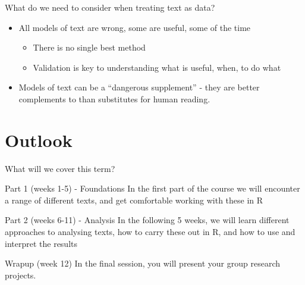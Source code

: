 \documentclass[
  10pt,
  ignorenonframetext,
  aspectratio=169]{beamer}
\begin{document}
\begin{frame}{What do we need to consider when treating text as data?}
\protect\hypertarget{what-do-we-need-to-consider-when-treating-text-as-data}{}
\label{CONSIDERATIONS}

\begin{itemize}
  \item<1-> All models of text are wrong, some are useful, some of the time 
  \begin{itemize}
    \item<2-> There is no single best method
    \item<3-> Validation is key to understanding what is useful, when, to do what
  \end{itemize}
  \item<4-> Models of text can be a ``dangerous supplement''  \hyperlink{PHARMAKON}{} - they are better complements to than substitutes for human reading.


\end{itemize}
\end{frame}

\hypertarget{outlook}{%
\section{Outlook}\label{outlook}}

\begin{frame}{What will we cover this term?}
\protect\hypertarget{what-will-we-cover-this-term}{}
\begin{block}{Part 1 (weeks 1-5) - Foundations}
\protect\hypertarget{part-1-weeks-1-5---foundations}{}
In the first part of the course we will encounter a range of different
texts, and get comfortable working with these in R
\end{block}

\begin{block}{Part 2 (weeks 6-11) - Analysis}
\protect\hypertarget{part-2-weeks-6-11---analysis}{}
In the following 5 weeks, we will learn different approaches to
analysing texts, how to carry these out in R, and how to use and
interpret the results
\end{block}

\begin{block}{Wrapup (week 12)}
\protect\hypertarget{wrapup-week-12}{}
In the final session, you will present your group research projects.
\end{block}
\end{frame}
\end{document}
